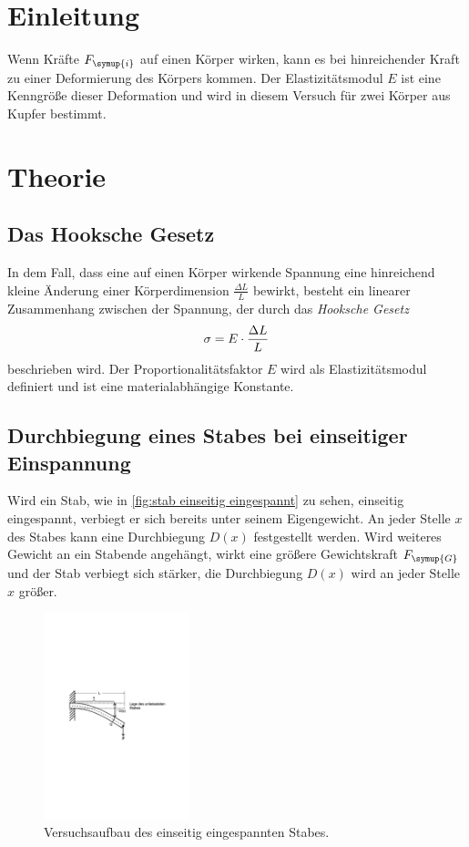 \section{Einleitung}
Wenn Kräfte $F_{\symup{i}}$ auf einen Körper wirken, kann es bei hinreichender Kraft zu einer Deformierung des Körpers kommen.
Der Elastizitätsmodul $E$ ist eine Kenngröße dieser Deformation und wird in diesem Versuch für zwei Körper aus Kupfer bestimmt.

\section{Theorie}
\label{sec:Theorie}

\subsection{Das Hooksche Gesetz}
\label{sec:hook}
In dem Fall, dass eine auf einen Körper wirkende Spannung eine hinreichend kleine Änderung einer Körperdimension 
$\frac{\Delta L}{L}$ bewirkt, besteht ein linearer Zusammenhang zwischen der Spannung, der durch das 
\textit{Hooksche Gesetz}
\begin{equation}
    \sigma = E \cdot \frac{\Delta L} {L} \notag
    \label{eq:hook}
\end{equation}
beschrieben wird. Der Proportionalitätsfaktor $E$ wird als Elastizitätsmodul 
definiert und ist eine materialabhängige Konstante.
\subsection{Durchbiegung eines Stabes bei einseitiger Einspannung}
\label{sec:einseitig}
Wird ein Stab, wie in \autoref{fig:stab einseitig eingespannt} zu sehen, einseitig eingespannt, verbiegt er sich bereits 
unter seinem Eigengewicht. An jeder Stelle $x$ des Stabes kann eine Durchbiegung $D(x)$ festgestellt werden.
Wird weiteres Gewicht an ein Stabende angehängt, wirkt eine größere Gewichtskraft $F_{\symup{G}}$ und der Stab 
verbiegt sich stärker, die Durchbiegung $D(x)$ wird an jeder Stelle $x$ größer.
\begin{figure}
    \centering
    \includegraphics[height=6cm]{content/Abbildungen/stab_einseitig_eingespannt.pdf}
    \caption{Versuchsaufbau des einseitig eingespannten Stabes. \cite{v103}}
    \label{fig:stab einseitig eingespannt}
\end{figure}

